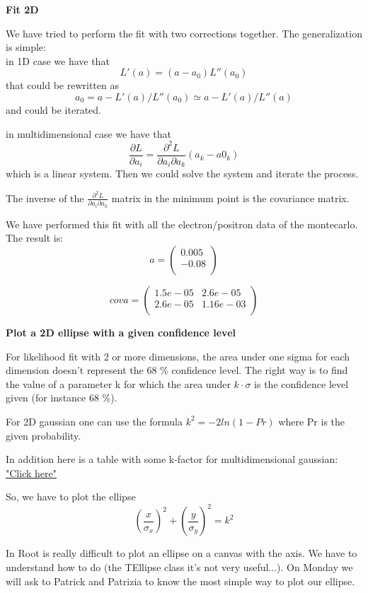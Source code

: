 \textbf{Fit 2D}

We have tried to perform the fit with two corrections together. The generalization is simple: \\
in 1D case we have that 
\[ L'(a)=(a-a_0)L''(a_0)\]
that could be rewritten as \[a_0=a- L'(a)/L''(a_0) \simeq a- L'(a)/L''(a) \]
and could be iterated.

in multidimensional case we have that 
\[ \frac{\partial L}{\partial a_i} = \frac{\partial ^2 L}{\partial a_i \partial a_k} (a_k - a0_k)\]
which is a linear system. Then we could solve the system and iterate the process.

The inverse of the $\frac{\partial^2 L}{\partial a_i \partial a_k}$ matrix in the minimum point is the covariance matrix.

We have performed this fit with all the electron/positron data of the montecarlo. The result is:
\[ 
a=\left(
\begin{array}{c}
0.005\\
-0.08\\
\end{array} 
\right)
\]

\[
cova=\left(
\begin{array}{cc}
1.5e-05 & 2.6e-05\\
2.6e-05 & 1.16e-03\\
\end{array}
\right)
\]

\textbf{Plot a 2D ellipse with a given confidence level}

For likelihood fit with 2 or more dimensions, the area under one sigma for each dimension doesn't represent the 68 \% confidence level. The right way is to find the value of a parameter k for which the area under $k \cdot \sigma$ is the confidence level given (for instance 68 \%).

For 2D gaussian one can use the formula $k^2=-2 ln(1-Pr)$ where Pr is the given probability.

In addition here is a table with some k-factor for multidimensional gaussian: \href{https://people.richland.edu/james/lecture/m170/tbl-chi.html}{"Click here"}

So, we have to plot the ellipse \[\left(\frac{x}{\sigma_x}\right)^2 + \left(\frac{y}{\sigma_y}\right)^2 = k^2 \]

In Root is really difficult to plot an ellipse on a canvas with the axis. We have to understand how to do (the TEllipse class it's not very useful...). On Monday we will ask to Patrick and Patrizia to know the most simple way to plot our ellipse.

